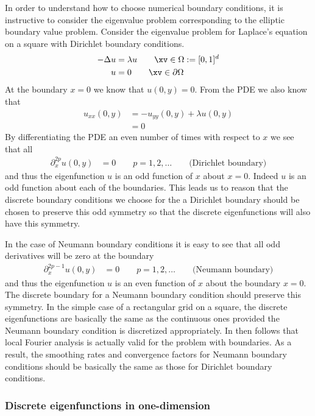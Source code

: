 In order to understand how to choose numerical boundary conditions,
it is instructive to consider the eigenvalue problem
corresponding to the elliptic boundary value problem.
Consider the eigenvalue problem for Laplace's equation on a square with Dirichlet
boundary conditions.
\begin{align*}
   - \Delta u & = \lambda u \qquad \xv\in\Omega := [0,1]^d \\
    u&=0  \qquad  \xv\in\partial\Omega   
\end{align*}
At the boundary $x=0$ we know that $u(0,y)=0$. From the PDE we also
know that 
\begin{align*}
  u_{xx}(0,y) &= - u_{yy}(0,y) + \lambda u(0,y) \\
              & = 0
\end{align*}
By differentiating the PDE an even number of times with respect to $x$ we see that all
\begin{align*}
  \partial_x^{2p} u(0,y) &= 0 \qquad p=1,2,\ldots \qquad\mbox{(Dirichlet boundary)}
\end{align*}
and thus the eigenfunction $u$ is an odd function of $x$ about $x=0$. 
Indeed $u$ is an odd function about each of the boundaries. 
This leads us to reason that the discrete boundary conditions we choose for the
a Dirichlet boundary should be chosen to preserve this odd symmetry so that the discrete
eigenfunctions will also have this symmetry. 

In the case of Neumann boundary conditions it is easy to see that all odd derivatives will
be zero at the boundary
\begin{align*}
  \partial_x^{2p-1} u(0,y) &= 0 \qquad p=1,2,\ldots\qquad\mbox{(Neumann boundary)}
\end{align*}
and thus the eigenfunction $u$ is an even function of $x$ about the boundary $x=0$.
The discrete boundary for a Neumann boundary condition should preserve this symmetry.
In the simple case of a rectangular grid on a square, the discrete eigenfunctions
are basically the same as the continuous ones provided the Neumann boundary condition
is discretized appropriately. In then follows that local Fourier analysis is actually
valid for the problem with boundaries. As a result, the smoothing rates and
convergence factors for Neumann boundary conditions should be basically the same as those
for Dirichlet boundary conditions.

\subsubsection{Discrete eigenfunctions in one-dimension}

